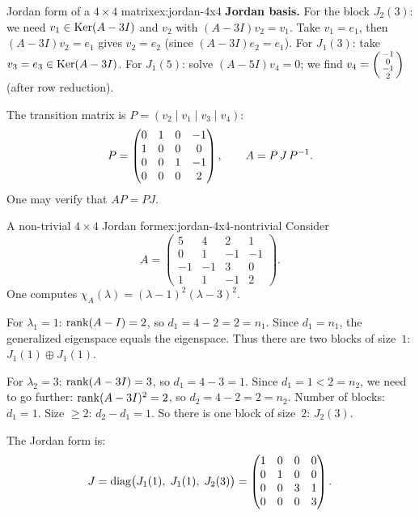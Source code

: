 \begin{example}{Jordan form of a $4 \times 4$ matrix}{ex:jordan-4x4}
\textbf{Jordan basis.}  For the block $J_2(3)$: we need $v_1 \in
\operatorname{Ker}(A - 3I)$ and $v_2$ with $(A - 3I)v_2 = v_1$.  Take
$v_1 = e_1$, then $(A - 3I)v_2 = e_1$ gives $v_2 = e_2$ (since
$(A-3I)e_2 = e_1$).  For $J_1(3)$: take $v_3 = e_3 \in \operatorname{Ker}(A-3I)$.
For $J_1(5)$: solve $(A - 5I)v_4 = 0$; we find
$v_4 = \begin{psmallmatrix} -1\\0\\-1\\2 \end{psmallmatrix}$
(after row reduction).

The transition matrix is $P = (v_2 \mid v_1 \mid v_3 \mid v_4)$:
\[
  P = \begin{pmatrix}
    0 & 1 & 0 & -1 \\
    1 & 0 & 0 & 0 \\
    0 & 0 & 1 & -1 \\
    0 & 0 & 0 & 2
  \end{pmatrix}, \qquad
  A = P\,J\,{P}^{-1}.
\]
One may verify that $AP = PJ$.
\end{example}

\begin{example}{A non-trivial $4 \times 4$ Jordan form}{ex:jordan-4x4-nontrivial}
Consider
\[
  A = \begin{pmatrix}
    5 & 4 & 2 & 1 \\
    0 & 1 & -1 & -1 \\
    -1 & -1 & 3 & 0 \\
    1 & 1 & -1 & 2
  \end{pmatrix}.
\]
One computes $\chi_A(\lambda) = (\lambda - 1)^2(\lambda - 3)^2$.

For $\lambda_1 = 1$: $\operatorname{rank}(A - I) = 2$, so $d_1 = 4 - 2 = 2 = n_1$.
Since $d_1 = n_1$, the generalized eigenspace equals the eigenspace.
Thus there are two blocks of size~$1$: $J_1(1) \oplus J_1(1)$.

For $\lambda_2 = 3$: $\operatorname{rank}(A - 3I) = 3$, so
$d_1 = 4 - 3 = 1$.  Since $d_1 = 1 < 2 = n_2$, we need to go further:
$\operatorname{rank}(A - 3I)^2 = 2$, so $d_2 = 4 - 2 = 2 = n_2$.
Number of blocks: $d_1 = 1$.  Size $\geq 2$: $d_2 - d_1 = 1$.
So there is one block of size~$2$: $J_2(3)$.

The Jordan form is:
\[
  J = \operatorname{diag}\bigl(J_1(1),\; J_1(1),\; J_2(3)\bigr)
  = \begin{pmatrix}
    1 & 0 & 0 & 0 \\
    0 & 1 & 0 & 0 \\
    0 & 0 & 3 & 1 \\
    0 & 0 & 0 & 3
  \end{pmatrix}.
\]
\end{example}


